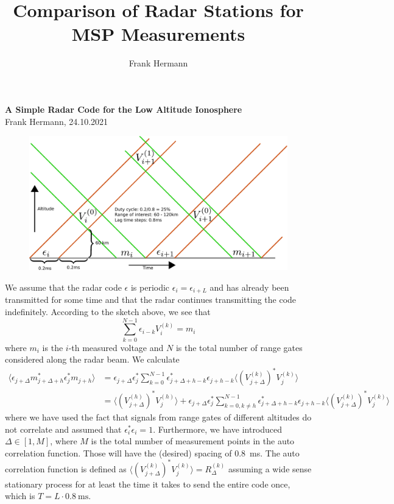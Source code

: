 \documentclass[18pt,a4paper]{extarticle}
\author{Frank Hermann}
\title{Comparison of Radar Stations for MSP Measurements}
\begin{document}
\begin{center}
	\textbf{\Large{A Simple Radar Code for the Low Altitude Ionosphere}}\\
	\small{Frank Hermann, 24.10.2021}
\end{center}
\begin{figure}[h!]
	\centering
	\includegraphics[width=0.8\linewidth]{code_diagram.pdf}
\end{figure}
We assume that the radar code $\epsilon$ is periodic $\epsilon_i = \epsilon_{i + L}$ and has already been transmitted for some time and that the radar continues transmitting the code indefinitely.
According to the sketch above, we see that
$$
\sum_{k=0}^{N-1} \epsilon_{i-k} V^{(k)}_i = m_i
$$
where $m_i$ is the $i$-th measured voltage and $N$ is the total number of range gates considered along the radar beam.
We calculate
\begin{align*}
\langle \epsilon_{j + \Delta}m_{j + \Delta + h}^* \epsilon_j^*m_{j+h}\rangle &= \epsilon_{j + \Delta}\epsilon_j^* \sum_{k=0}^{N-1} \epsilon_{j+\Delta+h-k}^*\epsilon_{j+h-k} \langle (V^{(k)}_{j + \Delta})^*V^{(k)}_j \rangle\\
&= \langle (V_{j+\Delta}^{(h)})^* V_j^{(h)} \rangle + \epsilon_{j + \Delta}\epsilon_j^*\sum_{k=0,k\neq h}^{N-1} \epsilon_{j+\Delta+h-k}^*\epsilon_{j+h-k} \langle (V^{(k)}_{j + \Delta})^*V^{(k)}_j \rangle
\end{align*}
where we have used the fact that signals from range gates of different altitudes do not correlate and assumed that $\epsilon_i^*\epsilon_i = 1$.
Furthermore, we have introduced $\Delta \in [1, M]$, where $M$ is the total number of measurement points in the auto correlation function.
Those will have the (desired) spacing of \SI{0.8}{\ms}.
The auto correlation function is defined as $\langle (V_{j+\Delta}^{(k)})^* V_j^{(k)} \rangle = R^{(k)}_\Delta$ assuming a wide sense stationary process for at least the time it takes to send the entire code once, which is $T = L\cdot\SI{0.8}{\ms}$.
\end{document}
